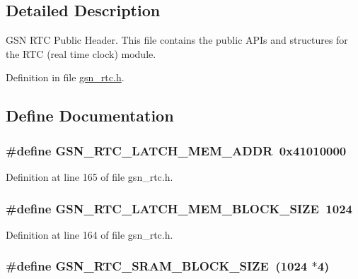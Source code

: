 \subsection{Detailed Description}
GSN RTC Public Header. This file contains the public APIs and structures for the RTC (real time clock) module. 

Definition in file \hyperlink{a00582_source}{gsn\_\-rtc.h}.



\subsection{Define Documentation}
\hypertarget{a00582_aa084e6874d928e77815dbe7381d6b97b}{
\subsubsection[{GSN\_\-RTC\_\-LATCH\_\-MEM\_\-ADDR}]{\setlength{\rightskip}{0pt plus 5cm}\#define GSN\_\-RTC\_\-LATCH\_\-MEM\_\-ADDR~0x41010000}}
\label{a00582_aa084e6874d928e77815dbe7381d6b97b}


Definition at line 165 of file gsn\_\-rtc.h.

\hypertarget{a00582_a7372cd2c556667ff0089643241db715c}{
\subsubsection[{GSN\_\-RTC\_\-LATCH\_\-MEM\_\-BLOCK\_\-SIZE}]{\setlength{\rightskip}{0pt plus 5cm}\#define GSN\_\-RTC\_\-LATCH\_\-MEM\_\-BLOCK\_\-SIZE~1024}}
\label{a00582_a7372cd2c556667ff0089643241db715c}


Definition at line 164 of file gsn\_\-rtc.h.

\hypertarget{a00582_ac30a46cb77d2c913ade1d5585bac19f5}{
\subsubsection[{GSN\_\-RTC\_\-SRAM\_\-BLOCK\_\-SIZE}]{\setlength{\rightskip}{0pt plus 5cm}\#define GSN\_\-RTC\_\-SRAM\_\-BLOCK\_\-SIZE~(1024 $\ast$4)}}
\label{a00582_ac30a46cb77d2c913ade1d5585bac19f5}


